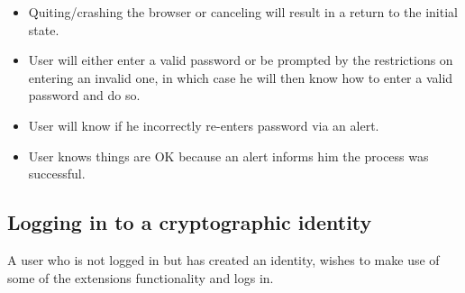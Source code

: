 \begin{desc}
\begin{itemize}
            \item Quiting/crashing the browser or canceling will result in a return to the initial state.
            
            \item User will either enter a valid password or be prompted by the restrictions on entering an invalid one, in which case he will then know how to enter a valid password and do so.
            
            \item User will know if he incorrectly re-enters password via an alert.
            
            \item User knows things are OK because an alert informs him the process was successful.
            
        \end{itemize}
\end{desc}

\subsection{Logging in to a cryptographic identity}
A user who is not logged in but has created an identity, wishes to make use of some of the extensions functionality and logs in.

